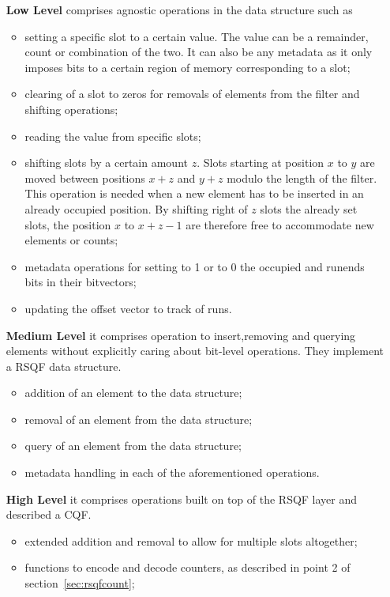 \begin{itemize}
	\item[\textbf{Low Level}] comprises agnostic operations in the data structure such as
	\begin{itemize}
		\item setting a specific slot to a certain value. The value can be a remainder, count or combination of the two. It can also be any metadata as it only imposes bits to a certain region of memory corresponding to a slot;
		\item clearing of a slot to zeros for removals of elements from the filter and shifting operations;
		\item reading the value from specific slots;
		\item shifting slots by a certain amount $z$. Slots starting at position $x$ to $y$ are moved between positions $x+z$ and $y+z$ modulo the length of the filter. This operation is needed when a new element has to be inserted in an already occupied position. By shifting right of $z$ slots the already set slots, the position $x$ to $x+z-1$ are therefore free to accommodate new elements or counts;
		\item metadata operations for setting to 1 or to 0 the occupied and runends bits in their bitvectors;
		\item updating the offset vector to track of runs.
	\end{itemize}
	\item[\textbf{Medium Level}] it comprises operation to insert,removing and querying elements without explicitly caring about bit-level operations. They implement a RSQF data structure.
	\begin{itemize}
		\item addition of an element to the data structure;
		\item removal of an element from the data structure;
		\item query of an element from the data structure;
		\item metadata handling in each of the aforementioned operations.
	\end{itemize}
	\item[\textbf{High Level}] it comprises operations built on top of the RSQF layer and described a CQF.
	\begin{itemize}
		\item extended addition and removal to allow for multiple slots altogether;
		\item functions to encode and decode counters, as described in point 2 of section~\ref{sec:rsqfcount};

\end{itemize}
\end{itemize}
